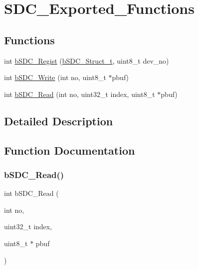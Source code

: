 \hypertarget{group___s_d_c___exported___functions}{}\section{S\+D\+C\+\_\+\+Exported\+\_\+\+Functions}
\label{group___s_d_c___exported___functions}
\subsection*{Functions}
\begin{DoxyCompactItemize}
\item 
int \mbox{\hyperlink{group___s_d_c___exported___functions_ga5ab5e9e0cf765d3be871c622e77dc5b2}{b\+S\+D\+C\+\_\+\+Regist}} (\mbox{\hyperlink{structb_s_d_c___struct__t}{b\+S\+D\+C\+\_\+\+Struct\+\_\+t}}, uint8\+\_\+t dev\+\_\+no)
\item 
int \mbox{\hyperlink{group___s_d_c___exported___functions_gadc0cbe401ec70e25ec4c21ff98d0c940}{b\+S\+D\+C\+\_\+\+Write}} (int no, uint8\+\_\+t $\ast$pbuf)
\item 
int \mbox{\hyperlink{group___s_d_c___exported___functions_gacb6dee14791b72cc5e127da8a5437319}{b\+S\+D\+C\+\_\+\+Read}} (int no, uint32\+\_\+t index, uint8\+\_\+t $\ast$pbuf)
\end{DoxyCompactItemize}


\subsection{Detailed Description}


\subsection{Function Documentation}
\mbox{\label{group___s_d_c___exported___functions_gacb6dee14791b72cc5e127da8a5437319}} 
\subsubsection{\texorpdfstring{b\+S\+D\+C\+\_\+\+Read()}{bSDC\_Read()}}
{\footnotesize\ttfamily int b\+S\+D\+C\+\_\+\+Read (\begin{DoxyParamCaption}\item[{int}]{no,  }\item[{uint32\+\_\+t}]{index,  }\item[{uint8\+\_\+t $\ast$}]{pbuf }\end{DoxyParamCaption})}

